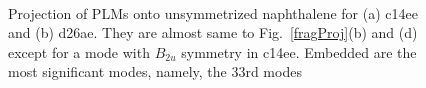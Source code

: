 \begin{figure}[!h]
\\
\caption{Projection of PLMs onto unsymmetrized naphthalene for (a) c14ee and (b) d26ae.
They are almost same to Fig.~\ref{fragProj}(b) and (d) except for a mode with $B_{2u}$ symmetry in c14ee.
Embedded are the most significant modes, namely, the 33rd modes \label{projNaph}}
\end{figure}



